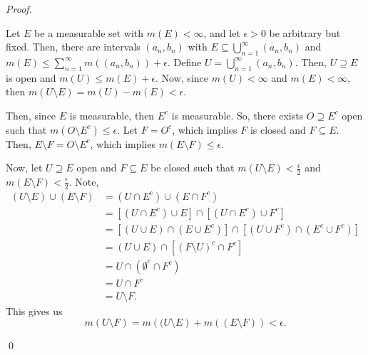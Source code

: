 \documentclass[12pt]{article}
\newenvironment{sol}
    {\emph{Proof.}
    }
    {
    \qed
    }
\begin{document}
  \begin{sol}
    Let $E$ be a measurable set with $m(E) < \infty$, and let $\epsilon > 0$ be arbitrary but fixed. Then, there are intervals $(a_n,b_n)$ with $E \subseteq \bigcup_{n = 1}^{\infty}(a_n,b_n)$ and $m(E) \leq \sum_{n = 1}^{\infty}m((a_n,b_n)) + \epsilon$. Define $U = \bigcup_{n = 1}^{\infty}(a_n,b_n)$. Then, $U \supseteq E$ is open and $m(U) \leq m(E) + \epsilon$. Now, since $m(U) < \infty$ and $m(E) < \infty$, then $m(U \setminus E) = m(U) - m(E) < \epsilon$.
    
    Then, since $E$ is measurable, then $E^c$ is measurable. So, there exists $O \supseteq E^c$ open such that $m(O \setminus E^c) \leq \epsilon$. Let $F = O^c$, which implies $F$ is closed and $F \subseteq E$. Then, $E \setminus F = O \setminus E^c$, which implies $m(E \setminus F) \leq \epsilon$. 
  
    Now, let $U \supseteq E$ open and $F \subseteq E$ be closed such that $m(U \setminus E) < \frac{\epsilon}{2}$ and $m(E \setminus F) < \frac{\epsilon}{2}$. Note, 
    \begin{align*}
      (U \setminus E) \cup (E \setminus F) &= (U \cap E^c) \cup (E \cap F^c) \\
      &= \left[(U \cap E^c) \cup E\right] \cap \left[(U \cap E^c) \cup F^c\right] \\
      &= \left[(U \cup E) \cap (E \cup E^c)\right] \cap \left[(U \cup F^c) \cap (E^c \cup F^c)\right] \\
      &= (U \cup E) \cap \left[(F \setminus U)^c \cap F^c\right] \\
      &= U \cap (\emptyset^c \cap F^c) \\
      &= U \cap F^c \\ &= U \setminus F.
    \end{align*}
    This gives us $$m(U \setminus F) = m\left( (U \setminus E \right) + m\left( (E \setminus F) \right) < \epsilon.$$
  \end{sol}
  
\end{document}
